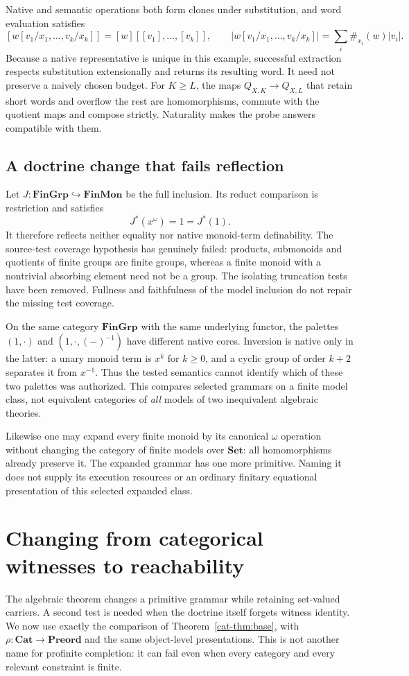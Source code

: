 \documentclass[11pt]{article}
\theoremstyle{definition}
\theoremstyle{remark}
\newcommand{\Set}{\mathbf{Set}}
\newcommand{\Cat}{\mathbf{Cat}}
\newcommand{\Preord}{\mathbf{Preord}}
\newcommand{\FinMon}{\mathbf{FinMon}}
\newcommand{\FinGrp}{\mathbf{FinGrp}}
\begin{document}
Native and semantic operations both form clones under substitution, and
word evaluation satisfies
\[
 [w[v_1/x_1,\ldots,v_k/x_k]]
       =[w][[v_1],\ldots,[v_k]],\qquad
 |w[v_1/x_1,\ldots,v_k/x_k]|
       =\sum_i\#_{x_i}(w)|v_i|.
\]
Because a native representative is unique in this example, successful
extraction respects substitution extensionally and returns its resulting
word. It need not preserve a naively chosen budget. For $K\geq L$, the
maps $Q_{X,K}\to Q_{X,L}$ that retain short words and overflow the rest
are homomorphisms, commute with the quotient maps and compose strictly.
Naturality makes the probe answers compatible with them.

\subsection{A doctrine change that fails reflection}
Let $J:\FinGrp\hookrightarrow\FinMon$ be the full inclusion.
Its reduct comparison is restriction and satisfies
\[
                 J^*(x^\omega)=1=J^*(1).
\]
It therefore reflects neither equality nor native monoid-term definability.
The source-test coverage hypothesis has genuinely failed: products,
submonoids and quotients of finite groups are finite groups, whereas a
finite monoid with a nontrivial absorbing element need not be a group.
The isolating truncation tests have been removed. Fullness and faithfulness
of the model inclusion do not repair the missing test coverage.

On the same category $\FinGrp$ with the same underlying functor, the
palettes $(1,\cdot)$ and $(1,\cdot,(-)^{-1})$ have different native cores.
Inversion is native only in the latter: a unary monoid term is $x^k$ for
$k\geq0$, and a cyclic group of order $k+2$ separates it from $x^{-1}$.
Thus the tested semantics cannot identify which of these two palettes was
authorized. This compares selected grammars on a finite model class, not
equivalent categories of \emph{all} models of two inequivalent algebraic
theories.

Likewise one may expand every finite monoid by its canonical $\omega$
operation without changing the category of finite models over $\Set$:
all homomorphisms already preserve it. The expanded grammar has one more
primitive. Naming it does not supply its execution resources or an
ordinary finitary equational presentation of this selected expanded class.


\section{Changing from categorical witnesses to reachability}
\label{sec:thinning}
The algebraic theorem changes a primitive grammar while retaining
set-valued carriers. A second test is needed when the doctrine itself
forgets witness identity. We now use exactly the comparison of
Theorem~\ref{cat-thm:base}, with $\rho:\Cat\to\Preord$ and the same
object-level presentations. This is not another name for profinite
completion: it can fail even when every category and every relevant
constraint is finite.
\end{document}
